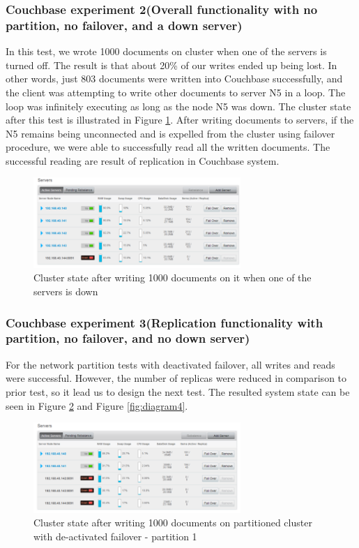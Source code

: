 \documentclass[a4paper]{article}
\begin{document}
\subsubsection{Couchbase experiment 2(Overall functionality with no partition, no failover, and a down server)}

In this test, we wrote 1000 documents on cluster when one of the servers is turned off.
The result is that about 20\% of our writes ended up being lost.
In other words, just 803 documents were written into Couchbase successfully, and the client was attempting to write other documents to server N5 in a loop.
The loop was infinitely executing as long as the node N5 was down.
The cluster state after this test is illustrated in Figure \ref{fig:diagram2}.
After writing documents to servers, if the N5 remains being unconnected and is expelled from the cluster using failover procedure, we were able to successfully read all the written documents.
The successful reading are result of replication in Couchbase system.

\begin{figure}[h!]
	\centering
	\includegraphics[width=0.7\textwidth]{diagram2}
	\caption{Cluster state after writing 1000 documents on it when one of the servers is down}
	\label{fig:diagram2}
\end{figure}

\subsubsection{Couchbase experiment 3(Replication functionality with partition, no failover, and no down server)}
For the network partition tests with deactivated failover, all writes and reads were successful.  
However, the number of replicas were reduced in comparison to prior test, so it lead us to design the next test.
The resulted system state can be seen in Figure \ref{fig:diagram3} and Figure \ref{fig:diagram4}.

\begin{figure}[h!]
	\centering
	\includegraphics[width=0.7\textwidth]{diagram3}
	\caption{Cluster state after writing 1000 documents on partitioned cluster with de-activated failover - partition 1}
	\label{fig:diagram3}
\end{figure}
\end{document}
